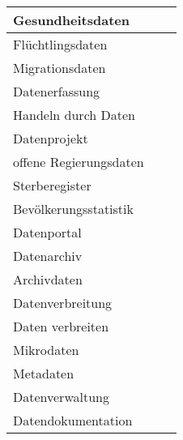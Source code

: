 \documentclass[
]{article}
\begin{document}
\begin{table}[H]
\begin{tabular}{l|l|l}
\hline
Gesundheitsdaten &  & \\
\hline
Flüchtlingsdaten &  & \\
\hline
Migrationsdaten &  & \\
\hline
Datenerfassung &  & \\
\hline
Handeln durch Daten &  & \\
\hline
Datenprojekt &  & \\
\hline
offene Regierungsdaten &  & \\
\hline
Sterberegister &  & \\
\hline
Bevölkerungsstatistik &  & \\
\hline
Datenportal &  & \\
\hline
Datenarchiv &  & \\
\hline
Archivdaten &  & \\
\hline
Datenverbreitung &  & \\
\hline
Daten verbreiten &  & \\
\hline
Mikrodaten &  & \\
\hline
Metadaten &  & \\
\hline
Datenverwaltung &  & \\
\hline
Datendokumentation &  & \\
\hline
\end{tabular}
\endgroup{}
\end{table}
\end{document}
